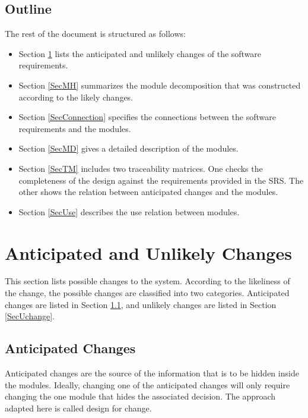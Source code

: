 \documentclass[12pt, titlepage]{article}
\begin{document}
	\subsection{Outline}
	The rest of the document is structured as follows:
	
	\begin{itemize}
		\item Section \ref{SecChange} lists the anticipated and unlikely changes of the software requirements. 
		\item Section \ref{SecMH} summarizes the module decomposition that was constructed according to the likely changes. 
		\item Section \ref{SecConnection} specifies the connections between the software requirements and the modules. \item Section \ref{SecMD} gives a detailed description of the modules. 
		\item Section \ref{SecTM} includes two traceability matrices. One checks the completeness of the design against the requirements provided in the SRS. The other shows the relation between anticipated changes and the modules. 
		\item Section \ref{SecUse} describes the use relation between modules. 
	\end{itemize}
	
	
	
	
	
	\section{Anticipated and Unlikely Changes} \label{SecChange}
	
	This section lists possible changes to the system. According to the likeliness
	of the change, the possible changes are classified into two
	categories. Anticipated changes are listed in Section \ref{SecAchange}, and
	unlikely changes are listed in Section \ref{SecUchange}.
	
	\subsection{Anticipated Changes} \label{SecAchange}
	
	Anticipated changes are the source of the information that is to be hidden
	inside the modules. Ideally, changing one of the anticipated changes will only
	require changing the one module that hides the associated decision. The approach
	adapted here is called design for
	change.
	
\end{document}
